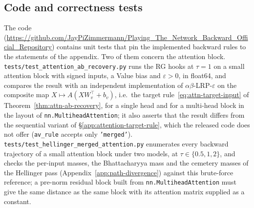\documentclass[twoside]{article}
\makeatletter
\newif\ifch \chfalse
\newcommand{\ch}[1]{\ifch\textcolor{magenta}{#1}\else#1\fi}
\newcommand{\coderepo}{\url{https://github.com/JayPiZimmermann/Playing_The_Network_Backward_Official_Repository}}
\newcommand{\1}{\mathbf{1}}
\providecommand{\captionof}[1]{\def\@captype{#1}\caption}
\makeatother
\begin{document}
\subsection{\texorpdfstring{\ch{Code and correctness tests}}{Code and correctness tests}}\label{app:code-tests}

\ch{The code (\coderepo) contains unit tests that pin the implemented backward rules to the statements
of the appendix. Two of them concern the attention block.
\texttt{tests/test\_attention\_ab\_recovery.py} runs the \ac{RG} hooks at $\tau = 1$ on a small
attention block with signed inputs, a Value bias and $\varepsilon > 0$, in float64, and compares the
result with an independent implementation of $\alpha\beta$-\ac{LRP}-$\varepsilon$ on the composite
map $X \mapsto A(XW_v^\top + b_v)$, i.e.\ the target rule~\eqref{eq:attn-target-input} of
Theorem~\ref{thm:attn-ab-recovery}, for a single head and for a multi-head block in the layout of
\texttt{nn.MultiheadAttention}; it also asserts that the result differs from the sequential variant
of \S\ref{app:attention-target-rule}, which the released code does not offer (\texttt{av\_rule}
accepts only \texttt{'merged'}).
\texttt{tests/test\_hellinger\_merged\_attention.py} enumerates every backward trajectory of a small
attention block under two models, at $\tau \in \{0.5, 1, 2\}$, and checks the per-input masses, the
Bhattacharyya mass and the cemetery masses of the Hellinger pass (Appendix~\ref{app:path-divergence})
against this brute-force reference; a pre-norm residual block built from \texttt{nn.MultiheadAttention}
must give the same distance as the same block with its attention matrix supplied as a constant.}
\newpage
\makeatletter
\providecommand{\captionof}[1]{\def\@captype{#1}\caption}
\providecommand{\appinputgen}[1]{\begingroup\def\^^M{\\}\endgroup}
\providecommand{\appinputgenlt}[1]{\appinputgen{#1}\addtocounter{table}{-1}}
\providecommand{\appinputgenci}[1]{\begingroup\fontsize{8.5}{10}\selectfont\def\tiny{\fontsize{5}{5.5}\selectfont}\appinputgenlt{#1}\endgroup}
\providecommand{\appneedspace}[1]{\par\penalty-100\begingroup\dimen0=\pagegoal\advance\dimen0-\pagetotal
\ifdim\dimen0<#1\relax\newpage\fi\endgroup}
\newsavebox{\appgenbox}
\providecommand{\appfitgen}[1]{\global\setbox\appgenbox=\hbox{\def\^^M{\\}}\ifdim\wd\appgenbox>\linewidth\resizebox{\linewidth}{!}{\usebox{\appgenbox}}\else\usebox{\appgenbox}\fi}
\makeatother%
\end{document}
